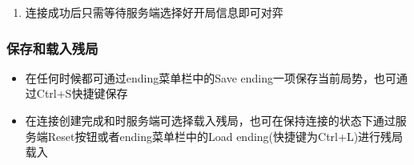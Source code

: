 \documentclass[a4paper,10pt]{article}
\begin{document}
\begin{enumerate}
\begin{figure}[htbp]
{\begin{minipage}{.3\textwidth}
                                                \end{minipage}
                                        }
                                \end{figure}
                         \item 连接成功后只需等待服务端选择好开局信息即可对弈
                        \end{enumerate}
                \subsubsection{保存和载入残局}
                        \begin{itemize}
                         \item 在任何时候都可通过ending菜单栏中的Save ending一项保存当前局势，也可通过Ctrl+S快捷键保存
                         \item 在连接创建完成和时服务端可选择载入残局，也可在保持连接的状态下通过服务端Reset按钮或者ending菜单栏中的Load ending(快捷键为Ctrl+L)进行残局载入
                        \end{itemize}
\end{document}
